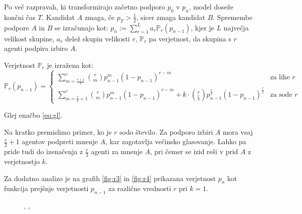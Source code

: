 \documentclass[a4paper,12pt]{article}
\newcommand{\p}{\mathbb{P}}
\begin{document}
Po več razpravah, ki transformirajo začetno podporo $p_0$ v $p_n$, model doseže končni čas $T$. 
Kandidat $A$ zmaga, če $p_T > \frac{1}{2}$, sicer zmaga kandidat $B$.
Spremembe podpore $A$ in $B$ se izračunajo kot:
\( p_n := \sum_{r=1}^{L} a_r \p_r(p_{n-1}) \),
kjer je $L$ največja velikost skupine, $a_r$ delež skupin velikosti $r$, $\p_r$ pa verjetnost, 
da skupina s $r$ agenti podpira izbiro $A$.

Verjetnost $\p_r$ je izražena kot:
\begin{equation}
    \label{eq:gl}
    \p_{r}(p_{n-1}) = 
    \begin{cases}
        \sum_{m=\frac{r+1}{2}}^r \binom{r}{m} p_{n-1}^m (1-p_{n-1})^{r-m} & \text{za lihe $r$} \\
        \sum_{m=\frac{r}{2} + 1}^r \binom{r}{m} p_{n-1}^m (1-p_{n-1})^{r-m} + k\cdot \binom{r}{\frac{r}{2}} p_{n-1}^\frac{r}{2} (1-p_{n-1})^\frac{r}{2} & \text{za sode $r$}
    \end{cases}
\end{equation}

% 

Glej enačbo \eqref{eq:gl}.

Na kratko premislimo primer, ko je $r$ sodo število. Za podporo izbiri $A$ mora vsaj $\frac{r}{2} + 1$ 
agentov podpreti mnenje $A$, kar zagotavlja večinsko glasovanje. Lahko pa pride tudi do izenačenja 
z $\frac{r}{2}$ agenti za mnenje $A$, pri čemer se izid reši v prid $A$ z verjetnostjo $k$. 

Za dodatno analizo je na grafih \ref{fig:r3} in \ref{fig:r4} prikazana verjetnost $p_n$ 
kot funkcija prejšnje verjetnosti $p_{n-1}$ za različne vrednosti $r$ pri $k=1$.

\begin{figure}[ht!]
    \centering
    , 
    ,

\end{figure}


 
\end{document}

